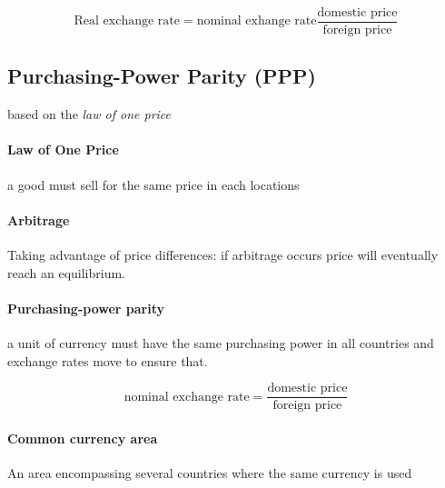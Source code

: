 \documentclass[a4paper,titlepage] {scrartcl}
\begin{document}
\begin{equation}
	\text{Real exchange rate} = \text{nominal exhange rate}\frac{\text{domestic price}}{\text{foreign price}}
\end{equation}


\subsection{Purchasing-Power Parity (PPP)}
based on the \emph{law of one price}
\paragraph{Law of One Price} %
\label{par:law_of_one_price}
a good must sell for the same price in each locations

\paragraph{Arbitrage} %
\label{par:arbitrage}
Taking advantage of price differences: if arbitrage occurs price will eventually reach an equilibrium.	

\paragraph{Purchasing-power parity} %
\label{par:purchasing_power_parity}
a unit of currency must have the same purchasing power in all countries and exchange rates move to ensure that.

\begin{equation}
	\text{nominal exchange rate} = \frac{\text{domestic price}}{\text{foreign price}}
\end{equation}


\paragraph{Common currency area} %
\label{par:common_currency_area}
An area encompassing several countries where the same currency is used


\end{document}
